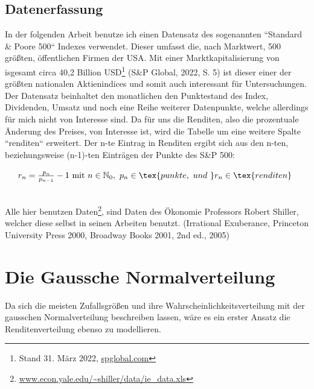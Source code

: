 \documentclass[12pt, a4paper]{report}
\theoremstyle{definition}
\begin{document}
\section{Datenerfassung}
In der folgenden Arbeit benutze ich einen Datensatz des sogenannten ``Standard \& Poore 500`` Indexes verwendet. Dieser umfasst die, nach Marktwert, 500 größten, öffentlichen Firmen der USA. Mit einer Marktkapitalisierung von isgesamt circa 40,2 Billion USD\footnote{Stand 31. März 2022, \href{https://www.spglobal.com/spdji/en/idsenhancedfactsheet/file.pdf?calcFrequency=M&force_download=true&hostIdentifier=48190c8c-42c4-46af-8d1a-0cd5db894797&indexId=340}{spglobal.com}} (S\&P Global, 2022, S. 5) ist dieser einer der größten nationalen Aktienindices und somit auch interessant für Untersuchungen. \\
Der Datensatz beinhaltet den monatlichen den Punktestand des Index, Dividenden, Umsatz und noch eine Reihe weiterer Datenpunkte, welche allerdings für mich nicht von Interesse sind. Da für uns die Renditen, also die prozentuale Änderung des Preises, von Interesse ist, wird die Tabelle um eine weitere Spalte ``renditen`` erweitert.
Der n-te Eintrag in Renditen ergibt sich aus den n-ten, beziehungsweise (n-1)-ten Einträgen der Punkte des S\&P 500:
\begin{center}
    $\indent r_{n} = \frac{p_{n}}{p_{n-1}} - 1 \text{ mit } n \in \mathbb{N}_{0},\ p_{n} \in \tex{ punkte,\ und \ } r_{n} \in \tex{renditen} \\$
\end{center} \\
\noindent Alle hier benutzen Daten\footnote{\url{www.econ.yale.edu/~shiller/data/ie_data.xls}}, sind Daten des Ökonomie Professors Robert Shiller, welcher diese selbst in seinen Arbeiten benutzt.
 (Irrational Exuberance, Princeton University Press 2000, Broadway Books 2001, 2nd ed., 2005)

\chapter{Die Gaussche Normalverteilung}
Da sich die meisten Zufallsgrößen und ihre Wahrscheinlichkeitsverteilung mit der gausschen Normalverteilung beschreiben lassen, wäre es ein erster Ansatz die Renditenverteilung ebenso zu modellieren.
\end{document}
